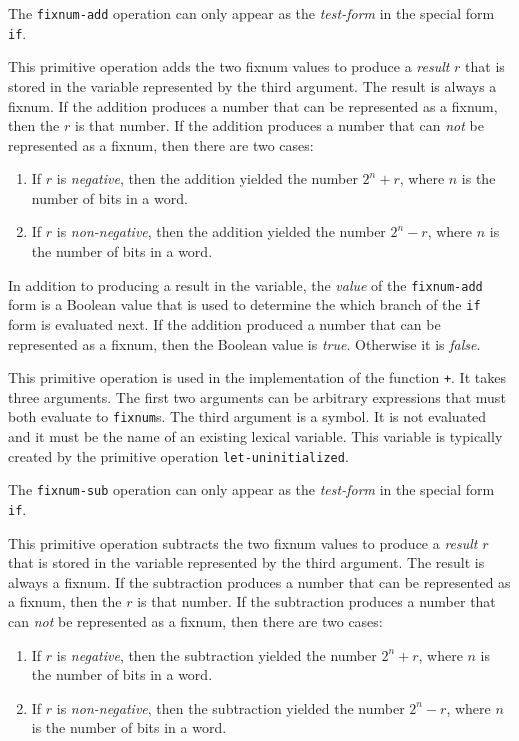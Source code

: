 The \texttt{fixnum-add} operation can only appear as the
\emph{test-form} in the special form \texttt{if}.

This primitive operation adds the two fixnum values to produce a
\emph{result} $r$ that is stored in the variable represented by the
third argument.  The result is always a fixnum.  If the addition
produces a number that can be represented as a fixnum, then the $r$
is that number.  If the addition produces a number that can \emph{not}
be represented as a fixnum, then there are two cases:

\begin{enumerate}
\item If $r$ is \emph{negative}, then the addition yielded the number
  $2^n + r$, where $n$ is the number of bits in a word.
\item If $r$ is \emph{non-negative}, then the addition yielded the
  number $2^n - r$, where $n$ is the number of bits in a word.
\end{enumerate}

In addition to producing a result in the variable, the \emph{value} of
the \texttt{fixnum-add} form is a Boolean value that is used to
determine the which branch of the \texttt{if} form is evaluated next.
If the addition produced a number that can be represented as a fixnum,
then the Boolean value is \emph{true}.  Otherwise it is \emph{false}.

 {}

This primitive operation is used in the implementation of the
\commonlisp{} function \texttt{+}.  It takes three arguments.  The
first two arguments can be arbitrary expressions that must both
evaluate to \texttt{fixnum}s.   The third argument is a symbol.  It is
not evaluated and it must be the name of an existing lexical
variable.  This variable is typically created by the primitive
operation \texttt{let-uninitialized}.

The \texttt{fixnum-sub} operation can only appear as the
\emph{test-form} in the special form \texttt{if}.

This primitive operation subtracts the two fixnum values to produce a
\emph{result} $r$ that is stored in the variable represented by the
third argument.  The result is always a fixnum.  If the subtraction
produces a number that can be represented as a fixnum, then the $r$ is
that number.  If the subtraction produces a number that can \emph{not}
be represented as a fixnum, then there are two cases:

\begin{enumerate}
\item If $r$ is \emph{negative}, then the subtraction yielded the
  number $2^n + r$, where $n$ is the number of bits in a word.
\item If $r$ is \emph{non-negative}, then the subtraction yielded the
  number $2^n - r$, where $n$ is the number of bits in a word.
\end{enumerate}

